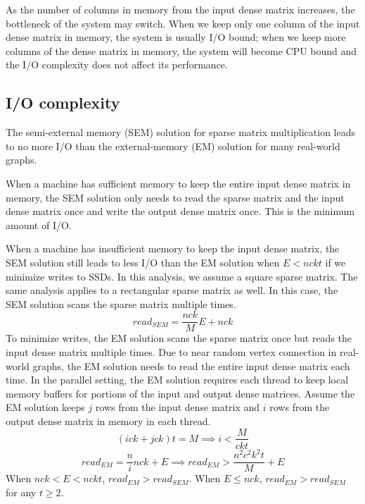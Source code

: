 As the number of columns in memory from the input dense matrix increases,
the bottleneck of the system
may switch. When we keep only one column of the input dense matrix in memory,
the system is usually I/O bound; when we keep more columns of the dense matrix
in memory, the system will become CPU bound and the I/O complexity does not
affect its performance.


\subsection{I/O complexity}
The semi-external memory (SEM) solution for sparse matrix multiplication leads
to no more I/O than the external-memory (EM) solution for many real-world graphs.

When a machine has sufficient memory to keep the entire input dense matrix
in memory, the SEM solution only needs to read the sparse matrix and the input
dense matrix once and write the output dense matrix once. This is
the minimum amount of I/O.

When a machine has insufficient memory to keep the input dense matrix, the SEM
solution still leads to less I/O than the EM solution when $E < n c k t$ if we
minimize writes to SSDs.
In this analysis, we assume a square sparse matrix. The same analysis applies
to a rectangular sparse matrix as well.
In this case, the SEM solution scans the sparse matrix multiple times.
\begin{equation*}
read_{SEM} = \frac{n c k}{M} E + n c k
\end{equation*}
To minimize writes, the EM solution
scans the sparse matrix once but reads the input dense matrix multiple times.
Due to near random vertex connection in real-world graphs, the EM solution needs to
read the entire input dense matrix each time. In the parallel setting,
the EM solution requires each thread to keep local memory buffers for portions
of the input and output dense matrices. Assume the EM solution keeps $j$ rows
from the input dense matrix and $i$ rows from the output dense matrix in memory
in each thread.
\begin{equation*}
(i c k + j c k) t = M \implies i < \frac{M}{c k t}
\end{equation*}
\begin{equation*}
read_{EM} = \frac{n}{i} n c k + E \implies  read_{EM} > \frac{n^2 c^2 k^2 t}{M} + E
\end{equation*}
When $n c k < E < n c k t$, $read_{EM} > read_{SEM}$.
When $E \leq n c k$, $read_{EM} > read_{SEM}$ for any $t \geq 2$.

